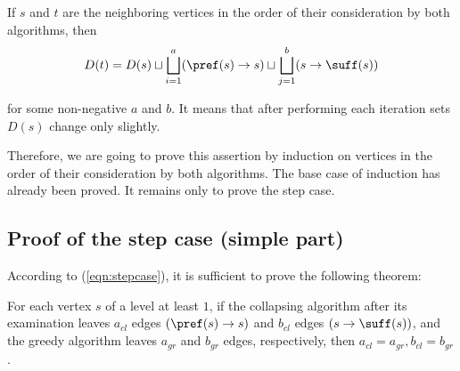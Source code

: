If $s$ and $t$ are the neighboring vertices in the order of their consideration by both algorithms, then
\begin{equation}
\label{eqn:stepcase}
    D(t) = D(s) \sqcup \bigsqcup_{i=1}^{a} (\pref(s) \to s) \sqcup \bigsqcup_{j=1}^{b} (s \to \suff(s))
\end{equation}

for some non-negative $ a $ and $ b $. It means that after performing each iteration sets $ D (s) $ change only slightly.

Therefore, we are going to prove this assertion by induction on vertices in the order of their consideration by both algorithms. The base case of induction has already been proved. It remains only to prove the step case.

\subsection{Proof of the step case (simple part)}

According to (\ref{eqn:stepcase}), it is sufficient to prove the following theorem:

\begin{theorem}
    For each vertex $ s $ of a level at least $ 1 $, if the collapsing algorithm after its examination leaves $ a_{cl} $ edges $ (\pref (s) \to s) $ and $ b_{cl} $ edges $ (s \to \suff(s) ) $, and the greedy algorithm leaves $ a_{gr} $ and $ b_{gr} $ edges, respectively, then $ a_{cl} = a_{gr}, b_{cl} = b_{gr} $.
\end{theorem}

